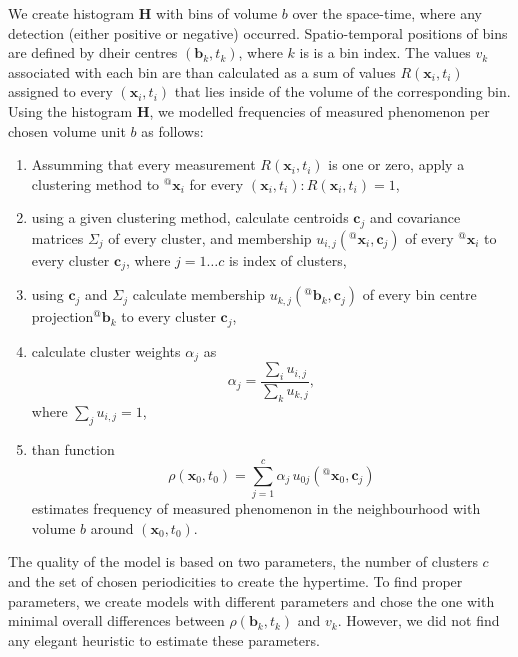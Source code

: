 We create histogram $\mathbf{H}$ with bins of volume $b$ over the space-time, where any detection (either positive or negative) occurred.
Spatio-temporal positions of bins are defined by dheir centres $\left(\mathbf{b}_{k}, t_{k}\right)$, where $k$ is is a bin index.
The values $v_{k}$ associated with each bin are than calculated as a sum of values $R\left(\mathbf{x}_i, t_i\right)$ assigned to every $\left(\mathbf{x}_i, t_i\right)$ that lies inside of the volume of the corresponding bin.
Using the histogram $\mathbf{H}$, we modelled frequencies of measured phenomenon per chosen volume unit $b$ as follows:
\begin{enumerate}
    \item Assumming that every measurement $R\left(\mathbf{x}_i, t_i\right)$ is one or zero,  apply a clustering method to ${}^{@}\mathbf{x}_{i}$ for every $\left(\mathbf{x}_i, t_i\right) : R\left(\mathbf{x}_i, t_i\right) = 1 $,
    \item using a given clustering method, calculate centroids $\mathbf{c}_j$ and covariance matrices $\Sigma_{j}$ of every cluster, and membership $u_{i, j}\left({}^{@}\mathbf{x}_{i}, \mathbf{c}_{j}\right)$ of every ${}^{@}\mathbf{x}_{i}$ to every cluster $\mathbf{c}_{j}$, where $j = 1\ldots c$ is index of clusters,
    \item using $\mathbf{c}_j$ and $\Sigma_{j}$ calculate membership $u_{k, j}\left({}^{@}\mathbf{b}_{k}, \mathbf{c}_{j}\right)$ of every bin centre projection${}^{@}\mathbf{b}_{k}$ to every cluster $\mathbf{c}_{j}$,
    \item calculate cluster weights $\alpha_{j}$ as
\begin{equation}\label{eqn:clusterWeights}
    \alpha_{j} = \frac{\sum_{i}u_{i, j}}{\sum_{k}u_{k, j}},
\end{equation}
where $\sum_{j}u_{i, j} = 1$,
    \item than function
\begin{equation}\label{eqn:distribution}
    \rho\left(\mathbf{x}_{0},t_{0}\right) = \sum_{j=1}^{c}{\alpha_j\,u_{0j}\left({}^{@}\mathbf{x}_{0}, \mathbf{c}_{j}\right)}
\end{equation}
estimates frequency of measured phenomenon in the neighbourhood with volume $b$ around $\left(\mathbf{x}_0, t_0\right)$.
\end{enumerate}
%


The quality of the model is based on two parameters, the number of clusters $c$ and the set of chosen periodicities to create the hypertime.
To find proper parameters, we create models with different parameters and chose the one with minimal overall differences between $\rho\left(\mathbf{b}_{k},t_{k}\right)$ and $v_{k}$.
However, we did not find any elegant heuristic to estimate these parameters.


